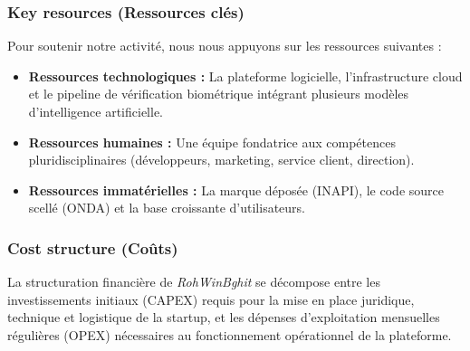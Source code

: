 \subsubsection{Key resources (Ressources clés)}

Pour soutenir notre activité, nous nous appuyons sur les ressources suivantes :
\begin{itemize}
    \item \textbf{Ressources technologiques :} La plateforme logicielle, l'infrastructure cloud et le pipeline de vérification biométrique intégrant plusieurs modèles d'intelligence artificielle.
    \item \textbf{Ressources humaines :} Une équipe fondatrice aux compétences pluridisciplinaires (développeurs, marketing, service client, direction).
    \item \textbf{Ressources immatérielles :} La marque déposée (INAPI), le code source scellé (ONDA) et la base croissante d'utilisateurs.
\end{itemize}

\subsubsection{Cost structure (Coûts)}

La structuration financière de \textit{RohWinBghit} se décompose entre les investissements initiaux (CAPEX) requis pour la mise en place juridique, technique et logistique de la startup, et les dépenses d'exploitation mensuelles régulières (OPEX) nécessaires au fonctionnement opérationnel de la plateforme.

